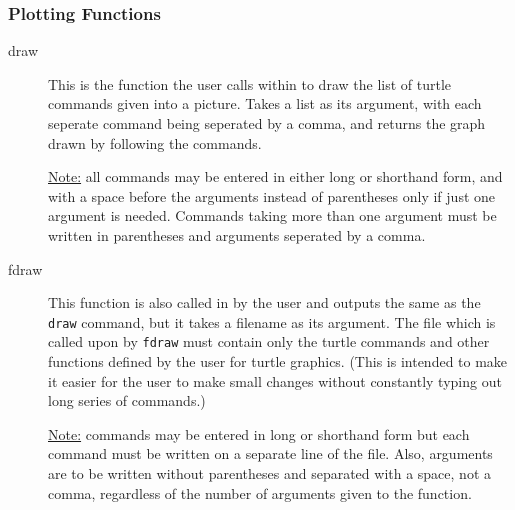 \subsubsection{Plotting Functions}
\begin{description}
 \item[draw] This is the function the user calls within {\REDUCE} to
       draw the list of turtle commands given into a picture. Takes a list
       as its argument, with each seperate command being seperated by a
       comma, and returns the graph drawn by following the commands.

       \underline{Note:} all commands may be entered in either long or
                         shorthand form, and with a space
                         before the arguments instead of parentheses only
                         if just one argument is needed. Commands taking
                         more than one argument must be written in
                         parentheses and arguments seperated by a comma.
 \item[fdraw] This function is also called in {\REDUCE} by the user 
       and outputs the same as the \texttt{draw} command, but it takes a
       filename as its argument. The file which is called upon by \texttt{fdraw}
       must contain only the turtle commands and other functions
       defined by the user for turtle graphics. (This is intended to make
       it easier for the user to make small changes without constantly
       typing out long series of commands.)

       \underline{Note:} commands may be entered in long or shorthand form
                         but each command must be written on a separate
                         line of the file. Also, arguments are to be
                         written without parentheses and separated with a
                         space, not a comma, regardless of the number of
                         arguments given to the function.
\end{description}


